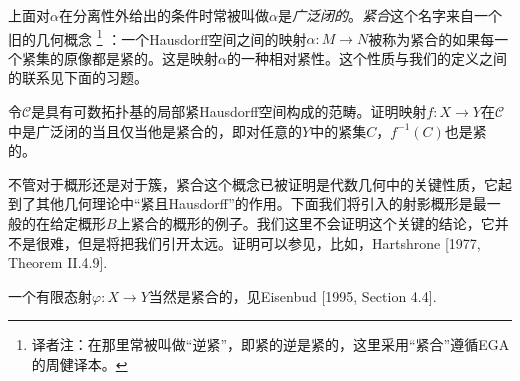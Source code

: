 上面对$\alpha$在分离性外给出的条件时常被叫做$\alpha$是\textit{广泛闭的}。\textit{紧合}这个名字来自一个旧的几何概念%
\footnote{译者注：在那里常被叫做“逆紧”，即紧的逆是紧的，这里采用“紧合”遵循EGA的周健译本。}%
：一个Hausdorff空间之间的映射$\alpha:M\to N$被称为紧合的如果每一个紧集的原像都是紧的。这是映射$\alpha$的一种相对紧性。这个性质与我们的定义之间的联系见下面的习题。

\begin{exe}
令$\mathscr C$是具有可数拓扑基的局部紧Hausdorff空间构成的范畴。证明映射$f:X\to Y$在$\mathscr C$中是广泛闭的当且仅当他是紧合的，即对任意的$Y$中的紧集$C$，$f^{-1}(C)$也是紧的。
\end{exe}

不管对于概形还是对于簇，紧合这个概念已被证明是代数几何中的关键性质，它起到了其他几何理论中“紧且Hausdorff”的作用。下面我们将引入的射影概形是最一般的在给定概形$B$上紧合的概形的例子。我们这里不会证明这个关键的结论，它并不是很难，但是将把我们引开太远。证明可以参见，比如，Hartshrone [1977, Theorem II.4.9].

一个有限态射$\varphi:X\to Y$当然是紧合的，见Eisenbud [1995, Section 4.4].
